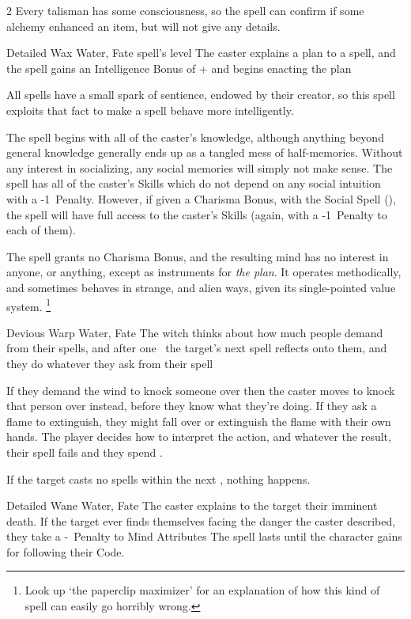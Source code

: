 \begin{multicols}{2}
{    Every \gls{talisman} has some consciousness, so the \gls{spell} can confirm if some \gls{alchemy} enhanced an item, but will not give any details.
  }


  {Detailed}%
  {Wax}%
  {Water, Fate}%
  {spell's level}%
  {The caster explains a plan to a spell, and the spell gains an Intelligence Bonus of + and begins enacting the plan}%
  {
  All spells have a small spark of sentience, endowed by their creator, so this spell exploits that fact to make a spell behave more intelligently.

  The spell begins with all of the caster's knowledge, although anything beyond general knowledge generally ends up as a tangled mess of half-memories.
  Without any interest in socializing, any social memories will simply not make sense.
  The spell has all of the caster's Skills which do not depend on any social intuition with a -1~Penalty.
  However, if given a Charisma Bonus, with the Social Spell (), the spell will have full access to the caster's Skills (again, with a -1~Penalty to each of them).

  The spell grants no Charisma Bonus, and the resulting mind has no interest in anyone, or anything, except as instruments for \emph{the plan}.
  It operates methodically, and sometimes behaves in strange, and alien ways, given its single-pointed value system.%
  \footnote{Look up `the paperclip maximizer' for an explanation of how this kind of spell can easily go horribly wrong.}
  }

  {Devious}%
  {Warp}%
  {Water, Fate}%
  {}%
  {The \gls{witch} thinks about how much people demand from their \glspl{spell}, and after one \showOnset\ the target's next \gls{spell} reflects onto them, and they do whatever they ask from their \gls{spell}}%
  {%
    If they demand the wind to knock someone over then the caster moves to knock that person over instead, before they know what they're doing.
    If they ask a flame to extinguish, they might fall over or extinguish the flame with their own hands.
    The player decides how to interpret the \gls{action}, and whatever the result, their \gls{spell} fails and they spend .

    If the target casts no \glspl{spell} within the next \showOnset, nothing happens.
  }

  {Detailed}%
  {Wane}%
  {Water, Fate}%
  {}%
  {The caster explains to the target their imminent death.
    If the target ever finds themselves facing the danger the caster described, they take a -~Penalty to Mind Attributes}%
  {The spell lasts until the character gains  for following their Code.}


\end{multicols}
